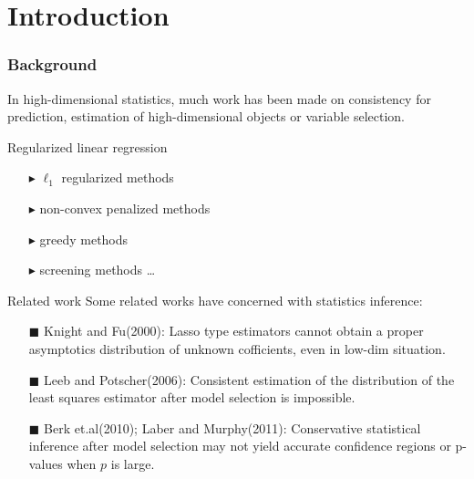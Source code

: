 \section{Introduction}
\begin{frame}
\sectionpage
\end{frame}


\begin{frame}
\frametitle{Background}
In high-dimensional statistics, much work has been made on consistency for prediction, estimation of high-dimensional objects or variable selection.
\begin{block}{Regularized linear regression}
  \begin{itemize}
  \item[$\blacktriangleright$] $\ell_{1}$ regularized methods
  \item[$\blacktriangleright$] non-convex penalized methods
  \item[$\blacktriangleright$] greedy methods
  \item[$\blacktriangleright$] screening methods
  \ldots
  \end{itemize}
\end{block}
\end{frame}

\begin{frame}{Related work}
  Some related works have concerned with statistics inference:
  \begin{itemize}
    \item[$\blacksquare$] Knight and Fu(2000): Lasso type estimators cannot obtain a proper asymptotics distribution of unknown cofficients, even in low-dim situation. 
    \item[$\blacksquare$] Leeb and Potscher(2006): Consistent estimation of the distribution
    of the least squares estimator after model selection is impossible.
    \item[$\blacksquare$] Berk et.al(2010); Laber and Murphy(2011): Conservative statistical inference after model selection may not yield accurate confidence regions or p-values when $p$ is large. 
  \end{itemize}
\end{frame}


